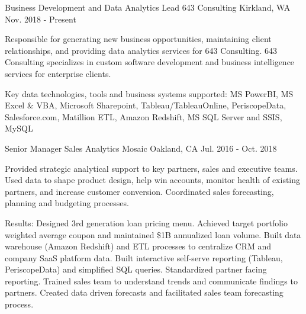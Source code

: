 


\begin{cventries}

\cventry
{Business Development and Data Analytics Lead} %
{643 Consulting} %
{Kirkland, WA} %
{Nov. 2018 - Present} %
{ %
\begin{cvitems}
\item {Responsible for generating new business opportunities, maintaining client relationships, and providing data analytics services for 643 Consulting. 643 Consulting specializes in custom software development and business intelligence services for enterprise clients.}
\end{cvitems}
}
{
\begin{cvitemsnb}
\item {Key data technologies, tools and business systems supported: MS PowerBI, MS Excel \& VBA, Microsoft Sharepoint, Tableau/TableauOnline, PeriscopeData, Salesforce.com, Matillion ETL, Amazon Redshift, MS SQL Server and SSIS, MySQL}
\end{cvitemsnb}
}
	
\cventry
{Senior Manager Sales Analytics} %
{Mosaic} %
{Oakland, CA} %
{Jul. 2016 - Oct. 2018} %
{ %
\begin{cvitems}
\item {Provided strategic analytical support to key partners, sales and executive teams. Used data to shape product design, help win accounts, monitor health of existing partners, and increase customer conversion. Coordinated sales forecasting, planning and budgeting processes.}
\end{cvitems}
}
\begin{cvitemsnb}
\item {Results: Designed 3rd generation loan pricing menu. Achieved target portfolio weighted average coupon and maintained \$1B annualized loan volume. Built data warehouse (Amazon Redshift) and ETL processes to centralize CRM and company SaaS platform data. Built interactive self-serve reporting (Tableau, PeriscopeData) and simplified SQL queries. Standardized partner facing reporting. Trained sales team to understand trends and communicate findings to partners. Created data driven forecasts and facilitated sales team forecasting process.}
\end{cvitemsnb}
	

\end{cventries}
